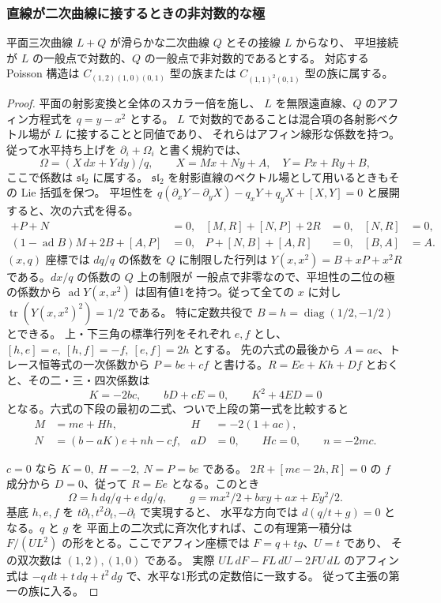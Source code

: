 \subsubsection{直線が二次曲線に接するときの非対数的な極}
\label{p12:sec:tangentgoodline}
\begin{proposition}\label{p12:th:tangent-line}
平面三次曲線 $L+Q$ が滑らかな二次曲線 $Q$ とその接線 $L$ からなり、
平坦接続が $L$ の一般点で対数的、$Q$ の一般点で非対数的であるとする。
対応する Poisson 構造は $C_{(1,2)(1,0)(0,1)}$ 型の族または
$C_{(1,1)^2(0,1)}$ 型の族に属する。
\end{proposition}
\begin{proof}
平面の射影変換と全体のスカラー倍を施し、
$L$ を無限遠直線、$Q$ のアフィン方程式を $q=y-x^2$ とする。
$L$ で対数的であることは混合項の各射影ベクトル場が $L$ に接することと同値であり、
それらはアフィン線形な係数を持つ。従って水平持ち上げを
$\partial_i+\Omega_i$ と書く規約では、
\[
 \Omega=(X\,dx+Y\,dy)/q,\qquad
 X=Mx+Ny+A,\quad Y=Px+Ry+B,
\]
ここで係数は $\mathfrak{sl}_2$ に属する。
$\mathfrak{sl}_2$ を射影直線のベクトル場として用いるときもその Lie 括弧を保つ。
平坦性を
$q(\partial_x Y-\partial_y X)-q_xY+q_yX+[X,Y]=0$
と展開すると、次の六式を得る。
\begin{align*}
 [M,P]+P+N&=0, & [M,R]+[N,P]+2R&=0, & [N,R]&=0,\\
 (1-\operatorname{ad}B)M+2B+[A,P]&=0, &
 P+[N,B]+[A,R]&=0, & [B,A]&=A.
\end{align*}
$(x,q)$ 座標では $dq/q$ の係数を $Q$ に制限した行列は
$Y(x,x^2)=B+xP+x^2R$ である。$dx/q$ の係数の $Q$ 上の制限が
一般点で非零なので、平坦性の二位の極の係数から
$\operatorname{ad}Y(x,x^2)$ は固有値1を持つ。従って全ての $x$ に対し
$\operatorname{tr}(Y(x,x^2)^2)=1/2$ である。
特に定数共役で $B=h=\operatorname{diag}(1/2,-1/2)$ とできる。
上・下三角の標準行列をそれぞれ $e,f$ とし、
$[h,e]=e,\ [h,f]=-f,\ [e,f]=2h$ とする。
先の六式の最後から $A=ae$、トレース恒等式の一次係数から
$P=be+cf$ と書ける。$R=E e+K h+D f$ とおくと、その二・三・四次係数は
\[
 K=-2bc,\qquad bD+cE=0,\qquad K^2+4ED=0
\]
となる。六式の下段の最初の二式、ついで上段の第一式を比較すると
\begin{align*}
 M&=m e+H h, & H&=-2(1+ac),\\
 N&=(b-aK)e+n h-c f, & aD&=0,\qquad Hc=0,\qquad n=-2mc.
\end{align*}

$c=0$ なら $K=0,\ H=-2,\ N=P=be$ である。
$2R+[m e-2h,R]=0$ の $f$ 成分から $D=0$、従って $R=Ee$ となる。このとき
\[
 \Omega=h\,dq/q+e\,dg/q,\qquad
 g=m x^2/2+bxy+ax+E y^2/2 .
\]
基底 $h,e,f$ を $t\partial_t,t^2\partial_t,-\partial_t$ で実現すると、
水平な方向では $d(q/t+g)=0$ となる。$q$ と $g$ を
平面上の二次式に斉次化すれば、この有理第一積分は
$F/(U L^2)$ の形をとる。ここでアフィン座標では $F=q+tg$、$U=t$ であり、
その双次数は $(1,2),(1,0)$ である。
実際 $U L\,dF-FL\,dU-2FU\,dL$ のアフィン式は
$-q\,dt+t\,dq+t^2\,dg$ で、水平な1形式の定数倍に一致する。
従って主張の第一の族に入る。


\end{proof}
